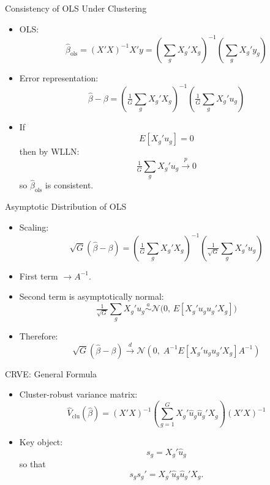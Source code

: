 \documentclass[
  ignorenonframetext,
]{beamer}
\providecommand{\tightlist}{%
  \setlength{\itemsep}{0pt}\setlength{\parskip}{0pt}}
\begin{document}
\begin{frame}{Consistency of OLS Under Clustering}
\label{consistency-of-ols-under-clustering}
\begin{itemize}
\tightlist
\item
  OLS: \[
  \hat\beta_{\text{ols}} = (X'X)^{-1} X'y
  = \left(\sum_g X_g'X_g\right)^{-1}\!\left(\sum_g X_g'y_g\right)
  \]
\item
  Error representation: \[
  \hat\beta - \beta
  =
  \left(\tfrac1G\sum_g X_g'X_g\right)^{-1}
  \left(\tfrac1G\sum_g X_g'u_g\right)
  \]
\item
  If\\
  \[
  E[X_g' u_g] = 0
  \] then by WLLN: \[
  \tfrac1G\sum_g X_g'u_g \xrightarrow{p}0
  \] so \(\hat\beta_{\text{ols}}\) is consistent.
\end{itemize}
\end{frame}

\begin{frame}{Asymptotic Distribution of OLS}
\label{asymptotic-distribution-of-ols}
\begin{itemize}
\tightlist
\item
  Scaling: \[
  \sqrt{G}(\hat\beta-\beta)
  =
  \left(\tfrac1G\sum_g X_g'X_g\right)^{-1}
  \left(\tfrac{1}{\sqrt{G}}\sum_g X_g'u_g\right)
  \]
\item
  First term \(\to A^{-1}\).\\
\item
  Second term is asymptotically normal: \[
  \tfrac1{\sqrt G}\sum_g X_g'u_g
  \overset{a}{\sim}
  \mathcal{N}\bigl(0,\,E[X_g' u_g u_g' X_g]\bigr)
  \]
\item
  Therefore: \[
  \sqrt{G}(\hat\beta-\beta)
  \xrightarrow{d}
  \mathcal{N}\!\left(0,\; A^{-1} E[X_g'u_g u_g'X_g] A^{-1}\right)
  \]
\end{itemize}
\end{frame}

\begin{frame}{CRVE: General Formula}
\label{crve-general-formula}
\begin{itemize}
\tightlist
\item
  Cluster-robust variance matrix: \[
  \hat V_{\text{clu}}(\hat\beta)
  =
  (X'X)^{-1}
  \left(\sum_{g=1}^G X_g'\hat u_g \hat u_g' X_g\right)
  (X'X)^{-1}
  \]
\item
  Key object: \[
  s_g = X_g'\hat u_g
  \] so that\\
  \[
  s_g s_g' = X_g' \hat u_g \hat u_g' X_g.
  \]
\end{itemize}
\end{frame}
\end{document}
